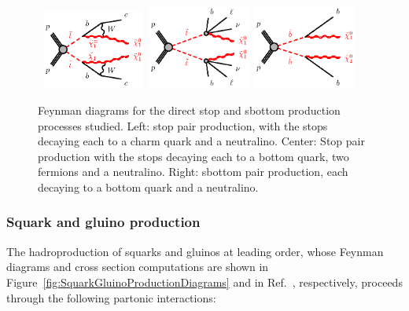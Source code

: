 \begin{figure}[!ht]
\begin{center}
\mbox{
\includegraphics[width=0.3\textwidth]{BeyondSM/Figures/stst-ccN1N1-bWC1loop.eps}
\includegraphics[width=0.3\textwidth]{BeyondSM/Figures/stst-blvblvN1N1-4body.eps}
\includegraphics[width=0.3\textwidth]{BeyondSM/Figures/sbsb-bbN1N1.eps}
}
\end{center}
\caption[Feynman diagrams for different stop and sbottom pair production processes.]{Feynman diagrams for the direct stop and sbottom production processes studied. Left: stop pair production, with the stops decaying each to a charm quark and a neutralino. Center: Stop pair production with the stops decaying each to a bottom quark, two fermions and a neutralino. Right: sbottom pair production, each decaying to a bottom quark and a neutralino.}
\label{fig:Diagrams3rdGen}
\end{figure}


\subsubsection{Squark and gluino production}

The hadroproduction of squarks and gluinos at leading order, whose Feynman diagrams and cross section computations are shown in Figure~\ref{fig:SquarkGluinoProductionDiagrams} and in Ref.~\cite{Beenakker:1996ch}, respectively, proceeds through the following partonic interactions:

